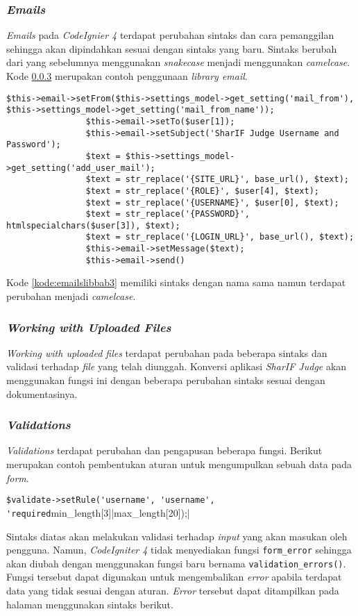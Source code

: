\subsubsection{\textit{Emails}}
\textit{Emails} pada \textit{CodeIgnier 4} terdapat perubahan sintaks dan cara pemanggilan sehingga akan dipindahkan sesuai dengan sintaks yang baru. Sintaks berubah dari yang sebelumnya menggunakan \textit{snakecase} menjadi menggunakan \textit{camelcase}. Kode \ref{} merupakan contoh penggunaan \textit{library email}.

\begin{lstlisting}[caption=Contoh perubahan \textit{library emails}, label=kode:emailslibbab3]
$this->email->setFrom($this->settings_model->get_setting('mail_from'), $this->settings_model->get_setting('mail_from_name'));
				$this->email->setTo($user[1]);
				$this->email->setSubject('SharIF Judge Username and Password');
				$text = $this->settings_model->get_setting('add_user_mail');
				$text = str_replace('{SITE_URL}', base_url(), $text);
				$text = str_replace('{ROLE}', $user[4], $text);
				$text = str_replace('{USERNAME}', $user[0], $text);
				$text = str_replace('{PASSWORD}', htmlspecialchars($user[3]), $text);
				$text = str_replace('{LOGIN_URL}', base_url(), $text);
				$this->email->setMessage($text);
				$this->email->send()
\end{lstlisting}

Kode \ref{kode:emailslibbab3} memiliki sintaks dengan nama sama namun terdapat perubahan menjadi \textit{camelcase}.

\subsubsection{\textit{Working with Uploaded Files}}
\textit{Working with uploaded files} terdapat perubahan pada beberapa sintaks dan validasi terhadap \textit{file} yang telah diunggah. Konversi aplikasi \textit{SharIF Judge} akan menggunakan fungsi ini dengan beberapa perubahan sintaks sesuai dengan dokumentasinya.

\subsubsection{\textit{Validations}}
\textit{Validations} terdapat perubahan dan pengapusan beberapa fungsi. Berikut merupakan contoh pembentukan aturan untuk mengumpulkan sebuah data pada \textit{form}.
\begin{center}
\verb|$validate->setRule('username', 'username', 'required|min\_length[3]|max\_length[20]);|
\end{center}
Sintaks diatas akan melakukan validasi terhadap \textit{input} yang akan masukan oleh pengguna. Namun, \textit{CodeIgniter 4} tidak menyediakan fungsi \texttt{form\_error} sehingga akan diubah dengan menggunakan fungsi baru bernama \texttt{validation\_errors()}. Fungsi tersebut dapat digunakan untuk mengembalikan \textit{error} apabila terdapat data yang tidak sesuai dengan aturan. \textit{Error} tersebut dapat ditampilkan pada halaman menggunakan sintaks berikut.

